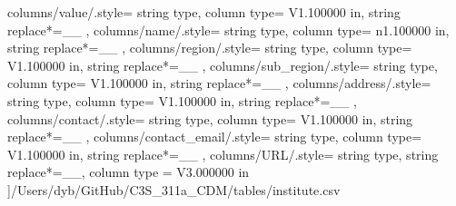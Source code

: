 \begin{landscape}
    columns/value/.style={
            string type, 
            column type= V{1.100000 in}, 
            string replace*={_}{\_}
        },
    columns/name/.style={
            string type, 
            column type= n{1.100000 in}, 
            string replace*={_}{\_}
        },
    columns/region/.style={
            string type, 
            column type= V{1.100000 in}, 
            string replace*={_}{\_}
        },
    columns/sub_region/.style={
            string type, 
            column type= V{1.100000 in}, 
            string replace*={_}{\_}
        },
    columns/address/.style={
            string type, 
            column type= V{1.100000 in}, 
            string replace*={_}{\_}
        },
    columns/contact/.style={
            string type, 
            column type= V{1.100000 in}, 
            string replace*={_}{\_}
        },
    columns/contact_email/.style={
            string type, 
            column type= V{1.100000 in}, 
            string replace*={_}{\_}
        },
    columns/URL/.style={
            string type, 
            string replace*={_}{\_},
            column type = V{3.000000 in}
        }
    ]{/Users/dyb/GitHub/C3S_311a_CDM/tables/institute.csv}
\end{landscape}
